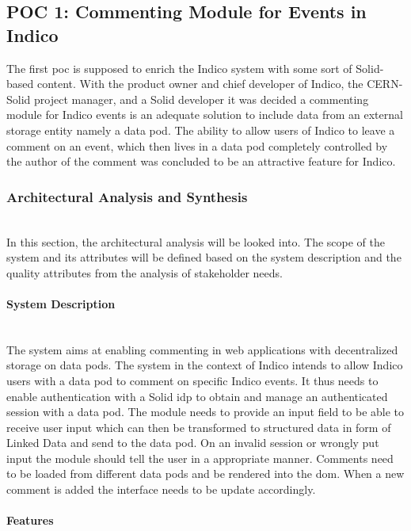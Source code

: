 \subsection{POC 1: Commenting Module for Events in Indico}

The first \gls{poc} is supposed to enrich the Indico system with some sort of Solid-based content. With the product owner and chief developer of Indico, the CERN-Solid project manager, and a Solid developer it was decided a commenting module for Indico events is an adequate solution to include data from an external storage entity namely a data pod. The ability to allow users of Indico to leave a comment on an event, which then lives in a data pod completely controlled by the author of the comment was concluded to be an attractive feature for Indico.

\subsubsection{Architectural Analysis and Synthesis}\mbox{}\\

In this section, the architectural analysis will be looked into. The scope of the system and its attributes will be defined based on the system description and the quality attributes from the analysis of stakeholder needs.
\vspace{0.5cm}
\paragraph{System Description}\mbox{}\\

The system aims at enabling commenting in web applications with decentralized storage on data pods. The system in the context of Indico intends to allow Indico users with a data pod to comment on specific Indico events. It thus needs to enable authentication with a Solid \gls{idp} to obtain and manage an authenticated session with a data pod. The module needs to provide an input field to be able to receive user input which can then be transformed to structured data in form of Linked Data and send to the data pod. On an invalid session or wrongly put input the module should tell the user in a appropriate manner. Comments need to be loaded from different data pods and be rendered into the \gls{dom}. When a new comment is added the interface needs to be update accordingly.
\vspace{0.5cm}
\paragraph{Features}\mbox{}\\

